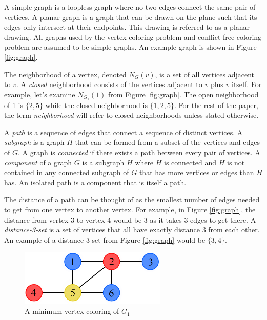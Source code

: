 \documentclass{sig-alternate}
\begin{document}
A simple graph is a loopless graph where no two edges connect the same pair of vertices. A planar graph is a graph that can be drawn on the plane such that its edges only intersect at their endpoints. This drawing is referred to as a planar drawing. All graphs used by the vertex coloring problem and conflict-free coloring problem are assumed to be simple graphs. An example graph is shown in Figure \ref{fig:graph}.

The neighborhood of a vertex, denoted $N_G(v)$, is a set of all vertices adjacent to $v$. A \emph{closed} neighborhood consists of the vertices adjacent to $v$ plus $v$ itself. For example, let's examine $N_{G_1}(1)$ from Figure \ref{fig:graph}. The open neighborhood of 1 is $\{2, 5\}$ while the closed neighborhood is $\{1, 2, 5\}$. For the rest of the paper, the term \emph{neighborhood} will refer to closed neighborhoods unless stated otherwise.

A \emph{path} is a sequence of edges that connect a sequence of distinct vertices. A \emph{subgraph} is a graph $H$ that can be formed from a subset of the vertices and edges of $G$. A graph is \emph{connected} if there exists a path between every pair of vertices. A \emph{component} of a graph $G$ is a subgraph $H$ where $H$ is connected and $H$ is not contained in any connected subgraph of $G$ that has more vertices or edges than $H$ has. An isolated path is a component that is itself a path.

The distance of a path can be thought of as the smallest number of edges needed to get from one vertex to another vertex. For example, in Figure \ref{fig:graph}, the distance from vertex 3 to vertex 4 would be 3 as it takes 3 edges to get there. A \emph{distance-3-set} is a set of vertices that all have exactly distance 3 from each other. An example of a distance-3-set from Figure \ref{fig:graph} would be $\{3,4\}$. \cite{bondy1976graph,west2001introduction}

\begin{figure}[h]
	\centering
	\includegraphics[width=7cm]{../figures/example-vcp.pdf}
	\caption{A minimum vertex coloring of $G_1$}\label{fig:vcp-example}
\end{figure}
\end{document}
